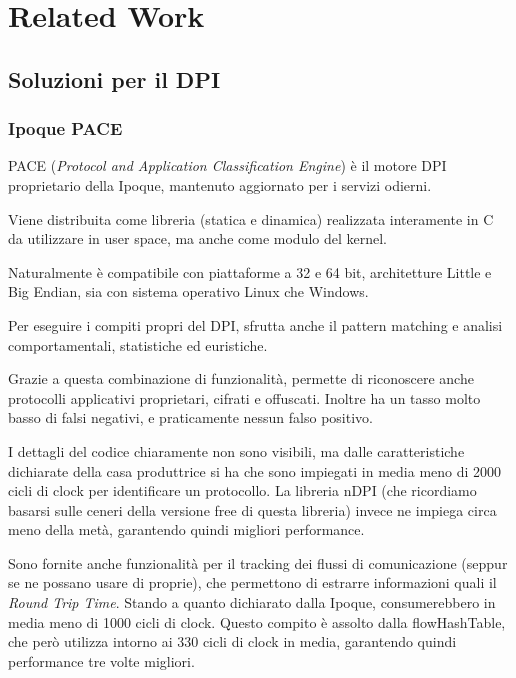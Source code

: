 \clearpage{\pagestyle{empty}\cleardoublepage}
\chapter{Related Work}

\section{Soluzioni per il DPI}

\subsection{Ipoque PACE}

PACE (\emph{Protocol and Application Classification Engine}) \cite{pace} è il motore DPI proprietario della Ipoque, mantenuto aggiornato per i servizi odierni.

Viene distribuita come libreria (statica e dinamica) realizzata interamente in C da utilizzare in user space, ma anche come modulo del kernel.

Naturalmente è compatibile con piattaforme a 32 e 64 bit, architetture Little e Big Endian, sia con sistema operativo Linux che Windows.

Per eseguire i compiti propri del DPI, sfrutta anche il pattern matching e analisi comportamentali, statistiche ed euristiche.

Grazie a questa combinazione di funzionalità, permette di riconoscere anche protocolli applicativi proprietari, cifrati e offuscati. Inoltre ha un tasso molto basso di falsi negativi, e praticamente nessun falso positivo.

I dettagli del codice chiaramente non sono visibili, ma dalle caratteristiche dichiarate della casa produttrice si ha che sono impiegati in media meno di 2000 cicli di clock per identificare un protocollo. La libreria nDPI (che ricordiamo basarsi sulle ceneri della versione free di questa libreria) invece ne impiega circa meno della metà, garantendo quindi migliori performance.

Sono fornite anche funzionalità per il tracking dei flussi di comunicazione (seppur se ne possano usare di proprie), che permettono di estrarre informazioni quali il \emph{Round Trip Time}. Stando a quanto dichiarato dalla Ipoque, consumerebbero in media meno di 1000 cicli di clock. Questo compito è assolto dalla flowHashTable, che però utilizza intorno ai 330 cicli di clock in media, garantendo quindi performance tre volte migliori.

